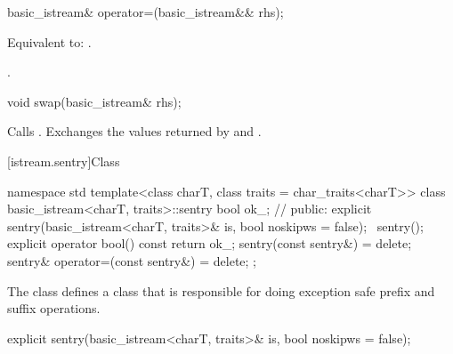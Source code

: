 %
\begin{itemdecl}
basic_istream& operator=(basic_istream&& rhs);
\end{itemdecl}

\begin{itemdescr}
\pnum
\effects
Equivalent to: .

\pnum
\returns
{}.
\end{itemdescr}

%
\begin{itemdecl}
void swap(basic_istream& rhs);
\end{itemdecl}

\begin{itemdescr}
\pnum
\effects
Calls .
Exchanges the values returned by  and
.
\end{itemdescr}

[istream.sentry]{Class }

%
%
\begin{codeblock}
namespace std {
  template<class charT, class traits = char_traits<charT>>
  class basic_istream<charT, traits>::sentry {
    bool ok_;                   // \expos
  public:
    explicit sentry(basic_istream<charT, traits>& is, bool noskipws = false);
    ~sentry();
    explicit operator bool() const { return ok_; }
    sentry(const sentry&) = delete;
    sentry& operator=(const sentry&) = delete;
  };
}
\end{codeblock}

\begin{itemdescr}
\pnum
The class
defines a class that is responsible for doing exception safe prefix and suffix
operations.
\end{itemdescr}

%
%
\begin{itemdecl}
explicit sentry(basic_istream<charT, traits>& is, bool noskipws = false);
\end{itemdecl}

